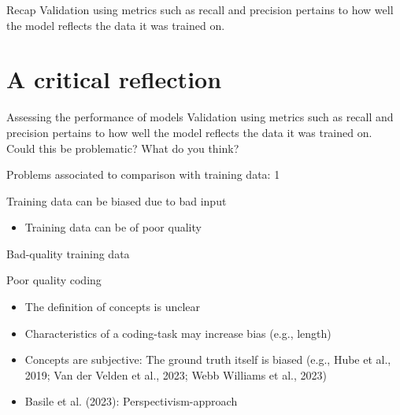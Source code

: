 \documentclass[compress]{beamer}
\begin{document}
\begin{frame}[fragile]{Recap} 	
Validation using metrics such as recall and precision pertains to how well the model reflects the data it was trained on. \\
\end{frame}


\section{A critical reflection}

\begin{frame}[fragile]{Assessing the performance of models} 	
Validation using metrics such as recall and precision pertains to how well the model reflects the data it was trained on. \\
Could this be problematic? What do you think?
\end{frame}


\begin{frame}[fragile]{Problems associated to comparison with training data: 1} 	
\begin{alertblock}{Training data can be biased due to bad input}
	\begin{itemize}
		\item Training data can be of poor quality
	\end{itemize}
\end{alertblock}
\end{frame}


\begin{frame}[fragile]{Bad-quality training data} 	
	\begin{alertblock}{Poor quality coding}
		\begin{itemize}
			\item The definition of concepts is unclear
			\item Characteristics of a coding-task may increase bias (e.g., length)
			\item Concepts are subjective: The ground truth itself is biased (e.g., Hube et al., 2019; Van der Velden et al., 2023; Webb Williams et al., 2023)
			\item Basile et al. (2023): Perspectivism-approach
		\end{itemize}
	\end{alertblock}
\end{frame}
\end{document}
